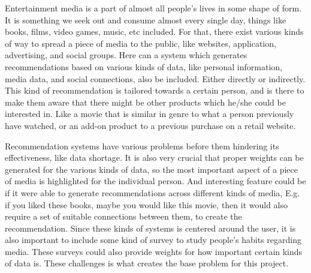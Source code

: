 Entertainment media is a part of almost all people’s lives in some shape of form. It is something we seek out and consume almost every single day, things like books, films, video games, music, etc included. For that, there exist various kinds of way to spread a piece of media to the public, like websites, application, advertising, and social groups. Here can a system which generates recommendations based on various kinds of data, like personal information, media data, and social connections, also be included. Either directly or indirectly. This kind of recommendation is tailored towards a certain person, and is there to make them aware that there might be other products which he/she could be interested in. Like a movie that is similar in genre to what a person previously have watched, or an add-on product to a previous purchase on a retail website.

Recommendation systems have various problems before them hindering its effectiveness, like data shortage. It is also very crucial that proper weights can be generated for the various kinds of data, so the most important aspect of a piece of media is highlighted for the individual person. And interesting feature could be if it were able to generate recommendations across different kinds of media, E.g. if you liked these books, maybe you would like this movie, then it would also require a set of suitable connections between them, to create the recommendation. Since these kinds of systems is centered around the user, it is also important to include some kind of survey to study people's habits regarding media. These surveys could also provide weights for how important certain kinds of data is. These challenges is what creates the base problem for this project.